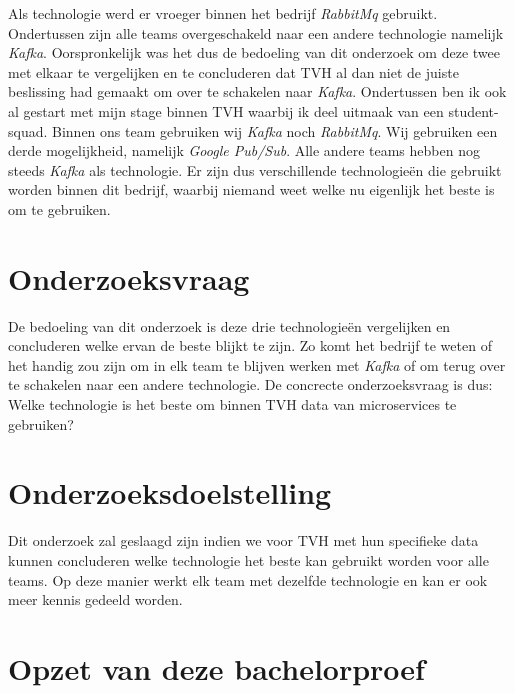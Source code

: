 Als technologie werd er vroeger binnen het bedrijf \emph{RabbitMq} gebruikt. Ondertussen zijn alle teams overgeschakeld naar een andere technologie namelijk \emph{Kafka}. Oorspronkelijk was het dus de bedoeling van dit onderzoek om deze twee met elkaar te vergelijken en te concluderen dat TVH al dan niet de juiste beslissing had gemaakt om over te schakelen naar \emph{Kafka}. Ondertussen ben ik ook al gestart met mijn stage binnen TVH waarbij ik deel uitmaak van een student-squad. Binnen ons team gebruiken wij \emph{Kafka} noch \emph{RabbitMq}. Wij gebruiken een derde mogelijkheid, namelijk \emph{Google Pub/Sub}. Alle andere teams hebben nog steeds \emph{Kafka} als technologie. Er zijn dus verschillende technologieën die gebruikt worden binnen dit bedrijf, waarbij niemand weet welke nu eigenlijk het beste is om te gebruiken. 

\section{Onderzoeksvraag}
\label{sec:onderzoeksvraag}

De bedoeling van dit onderzoek is deze drie technologieën vergelijken en concluderen welke ervan de beste blijkt te zijn. Zo komt het bedrijf te weten of het handig zou zijn om in elk team te blijven werken met \emph{Kafka} of om terug over te schakelen naar een andere technologie. De concrecte onderzoeksvraag is dus: Welke technologie is het beste om binnen TVH data van microservices te gebruiken?

\section{Onderzoeksdoelstelling}
\label{sec:onderzoeksdoelstelling}

Dit onderzoek zal geslaagd zijn indien we voor TVH met hun specifieke data kunnen concluderen welke technologie het beste kan gebruikt worden voor alle teams. Op deze manier werkt elk team met dezelfde technologie en kan er ook meer kennis gedeeld worden.

\section{Opzet van deze bachelorproef}
\label{sec:opzet-bachelorproef}


